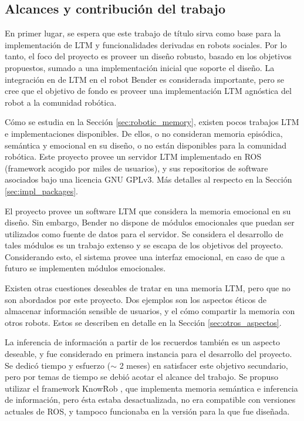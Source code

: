 \subsection{Alcances y contribución del trabajo}

En primer lugar, se espera que este trabajo de título sirva como base para la implementación de LTM y funcionalidades derivadas en robots sociales. Por lo tanto, el foco del proyecto es proveer un diseño robusto, basado en los objetivos propuestos, sumado a una implementación inicial que soporte el diseño. La integración en de LTM en el robot Bender es considerada importante, pero se cree que el objetivo de fondo es proveer una implementación LTM agnóstica del robot a la comunidad robótica.

Cómo se estudia en la Sección \ref{sec:robotic_memory}, existen pocos trabajos LTM e implementaciones disponibles. De ellos, o no consideran memoria episódica, semántica y emocional en su diseño, o no están disponibles para la comunidad robótica. Este proyecto provee un servidor LTM implementado en ROS (framework acogido por miles de usuarios\cite{ROS:2009}), y sus repositorios de software asociados bajo una licencia GNU GPLv3. Más detalles al respecto en la Sección \ref{sec:impl_packages}.

El proyecto provee un software LTM que considera la memoria emocional en su diseño. Sin embargo, Bender no dispone de módulos emocionales que puedan ser utilizados como fuente de datos para el servidor. Se considera el desarrollo de tales módulos es un trabajo extenso y se escapa de los objetivos del proyecto. Considerando esto, el sistema provee una interfaz emocional, en caso de que a futuro se implementen módulos emocionales.

Existen otras cuestiones deseables de tratar en una memoria LTM, pero que no son abordados por este proyecto. Dos ejemplos son los aspectos éticos de almacenar información sensible de usuarios, y el cómo compartir la memoria con otros robots. Estos se describen en detalle en la Sección \ref{sec:otros_aspectos}.

La inferencia de información a partir de los recuerdos también es un aspecto deseable, y fue considerado en primera instancia para el desarrollo del proyecto. Se dedicó tiempo y esfuerzo ($\sim$ 2 meses) en satisfacer este objetivo secundario, pero por temas de tiempo se debió acotar el alcance del trabajo. Se propuso utilizar el framework KnowRob \cite{Tenorth2009,Tenorth2013,Winkler2014}, que implementa memoria semántica e inferencia de información, pero ésta estaba desactualizada, no era compatible con versiones actuales de ROS, y tampoco funcionaba en la versión para la que fue diseñada.

